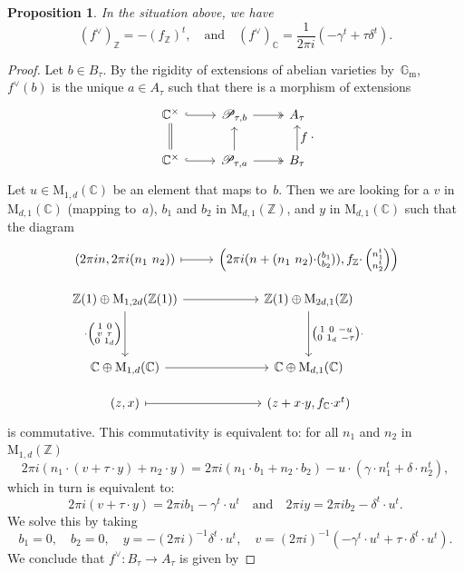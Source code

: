 \documentclass[11pt]{article}
\providecommand{\C}{}
\providecommand{\G}{}
\let\mathcal\mathscr
\let\oldvee\vee
\renewcommand{\vee}{{\scriptscriptstyle\oldvee}}
\theoremstyle{plain}
\newtheorem{Proposition}[subsection]{Proposition}
\theoremstyle{definition}
\numberwithin{equation}{subsection}
\renewcommand{\C}{\mathbb C}
\newcommand{\Z}{\mathbb Z}
\renewcommand{\G}{\mathbb G}
\newcommand{\calP}{\mathcal{P}}
\newcommand{\Gm}{\G_{\mathrm{m}}}
\newcommand{\rmM}{\mathrm{M}}
\begin{document}
\begin{Proposition}\label{prop:symm_on_Z}
In the situation above, we have
\[
(f^\vee)_\Z = -(f_\Z)^t, \quad \text{and} \quad
(f^\vee)_\C = \frac{1}{2\pi i}(-\gamma^t+\tau\delta^t).
\]
\end{Proposition}
\begin{proof}
Let $b\in B_\tau$. By the rigidity of extensions of abelian varieties
by~$\Gm$, $f^\vee(b)$ is the unique $a\in A_\tau$ such
that there is a morphism of extensions
\[
\begin{tikzcd}
\C^\times \ar[d, equal] \ar[r, hook] & \calP_{\tau,b} \ar[r, two heads] & A_\tau \\
\C^\times \ar[r, hook] & \calP_{\tau,a} \ar[r, two heads] \ar[u] &
B_\tau \ar[u, "\textstyle f"']
\end{tikzcd}.
\]
Let $u\in\rmM_{1,d}(\C)$ be an element that maps to~$b$. Then we are
looking for a $v$ in $\rmM_{d,1}(\C)$ (mapping to~$a$), $b_1$ and
$b_2$ in $\rmM_{d,1}(\Z)$, and $y$ in $\rmM_{d,1}(\C)$ such that the
diagram
\[
\begin{tikzcd}
(2\pi i n, 2\pi i(n_1\ n_2)) \ar[r, mapsto]
& \left(2\pi i (n + (n_1\ n_2){\cdot}(\substack{b_1\\ b_2})),
f_\Z{\cdot}\left(\substack{n_1^t\\ n_2^t}\right)\right) \\[-8pt]
\Z(1) \oplus \rmM_{1,2d}(\Z(1)) \ar[r]
\ar[dd,"{\cdot}\left(
\substack{1\ 0\\ v\ \tau\\ 0\ 1_d}\right)"']
& \Z(1) \oplus \rmM_{2d,1}(\Z)
\ar[dd, "\left(\substack{1\ 0\ -u\\ 0\ 1_d\ -\tau}\right){\cdot}"]\\ \\
\C \oplus \rmM_{1,d}(\C) \ar[r] & \C \oplus \rmM_{d,1}(\C) \\[-8pt]
(z,x) \ar[r,mapsto] & (z+x{\cdot}y, f_\C{\cdot}x^t)
\end{tikzcd}
\]
is commutative. This commutativity is equivalent to: for all
$n_1$ and $n_2$ in $\rmM_{1,d}(\Z)$
\[
2\pi i (n_1{\cdot}(v+\tau{\cdot}y) + n_2{\cdot}y) =
2\pi i (n_1{\cdot}b_1+n_2{\cdot}b_2) -u{\cdot}(\gamma{\cdot} n_1^t + \delta{\cdot} n_2^t),
\]
which in turn is equivalent to:
\[
2\pi i (v+\tau{\cdot}y) = 2\pi i b_1 -\gamma^t{\cdot}u^t
\quad\text{and}\quad
2\pi i y = 2\pi i b_2 -\delta^t{\cdot}u^t.
\]
We solve this by taking
\[
b_1=0,\quad b_2=0, \quad
y = -(2\pi i)^{-1}\delta^t{\cdot}u^t,\quad
v = (2\pi i)^{-1} (-\gamma^t{\cdot}u^t + \tau{\cdot}\delta^t{\cdot}u^t).
\]
We conclude that $f^\vee\colon B_\tau\to A_\tau$ is given by

\end{proof}
\end{document}
